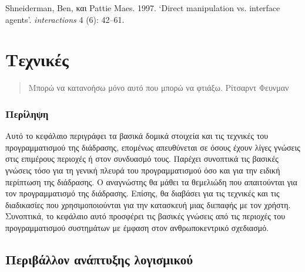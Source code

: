 \documentclass[
]{article}
\begin{document}
Shneiderman, Ben, και Pattie Maes. 1997. {`Direct manipulation vs.
interface agents'}. \emph{interactions} 4 (6): 42--61.

\hypertarget{ux3c4ux3b5ux3c7ux3bdux3b9ux3baux3adux3c2}{%
\section{Τεχνικές}\label{ux3c4ux3b5ux3c7ux3bdux3b9ux3baux3adux3c2}}

\begin{quote}
Μπορώ να κατανοήσω μόνο αυτό που μπορώ να φτιάξω. Ρίτσαρντ Φευνμαν
\end{quote}

\hypertarget{ux3c0ux3b5ux3c1ux3afux3bbux3b7ux3c8ux3b7}{%
\subsubsection{Περίληψη}\label{ux3c0ux3b5ux3c1ux3afux3bbux3b7ux3c8ux3b7}}

Αυτό το κεφάλαιο περιγράφει τα βασικά δομικά στοιχεία και τις τεχνικές
του προγραμματισμού της διάδρασης, επομένως απευθύνεται σε όσους έχουν
λίγες γνώσεις στις επιμέρους περιοχές ή στον συνδυασμό τους. Παρέχει
συνοπτικά τις βασικές γνώσεις τόσο για τη γενική πλευρά του
προγραμματισμού όσο και για την ειδική περίπτωση της διάδρασης. Ο
αναγνώστης θα μάθει τα θεμελιώδη που απαιτούνται για τον προγραμματισμό
της διάδρασης. Επίσης, θα διαβάσει για τις τεχνικές και τις διαδικασίες
που χρησιμοποιούνται για την κατασκευή μιας διεπαφής με τον χρήστη.
Συνοπτικά, το κεφάλαιο αυτό προσφέρει τις βασικές γνώσεις από τις
περιοχές του προγραμματισμού συστημάτων με έμφαση στον ανθρωποκεντρικό
σχεδιασμό.

\hypertarget{ux3c0ux3b5ux3c1ux3b9ux3b2ux3acux3bbux3bbux3bfux3bd-ux3b1ux3bdux3acux3c0ux3c4ux3c5ux3beux3b7ux3c2-ux3bbux3bfux3b3ux3b9ux3c3ux3bcux3b9ux3baux3bfux3cd}{%
\subsection{Περιβάλλον ανάπτυξης
λογισμικού}\label{ux3c0ux3b5ux3c1ux3b9ux3b2ux3acux3bbux3bbux3bfux3bd-ux3b1ux3bdux3acux3c0ux3c4ux3c5ux3beux3b7ux3c2-ux3bbux3bfux3b3ux3b9ux3c3ux3bcux3b9ux3baux3bfux3cd}}
\end{document}
